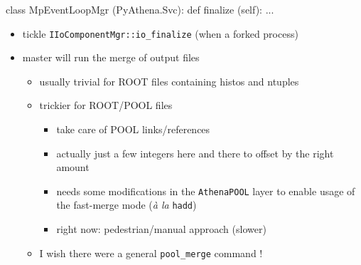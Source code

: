 \documentclass[9pt]{beamer}
\newcommand{\myred}  [1] {{\color{red}#1}}
\newcommand{\mygreen}[1] {{\color[rgb]{0,0.5,0}#1}}
\begin{document}
\begin{frame}[fragile]{}

  \begin{columns}
    \begin{column}{0.95\textwidth}

\begin{python}
class MpEventLoopMgr (PyAthena.Svc):
    def finalize (self): ...
\end{python}

\begin{block}{}
\begin{itemize}
  \item tickle \myred{\texttt{IIoComponentMgr::io\_finalize}} (when a forked process)
  \item master will run the merge of output files
    \begin{itemize}
      \item usually trivial for ROOT files containing histos and ntuples
      \item trickier for ROOT/POOL files
        \begin{itemize}
          \item take care of POOL links/references
          \item actually just a few integers here and there to offset by the right amount
          \item needs some modifications in the \texttt{AthenaPOOL} layer to enable usage of the fast-merge mode (\emph{\`a la} \texttt{hadd})
          \item right now: pedestrian/manual approach (slower)
        \end{itemize}
      \item \mygreen{I wish there were a general \texttt{pool\_merge} command !}
    \end{itemize}
\end{itemize}
\end{block}
    \end{column}
  \end{columns}
\end{frame}
\end{document}
